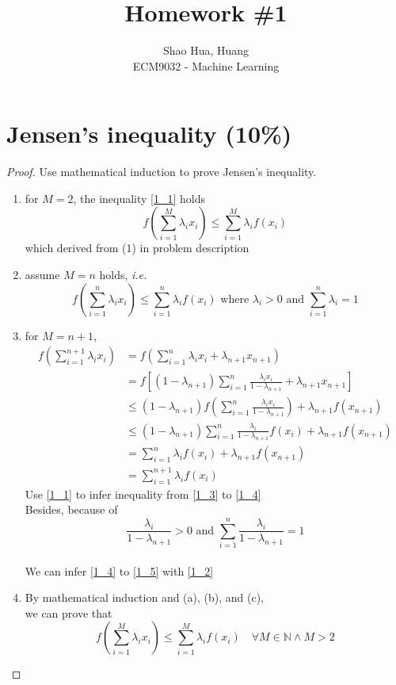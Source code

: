 \documentclass[12pt]{article}
\title{Homework \#1}
\author{Shao Hua, Huang\\
ECM9032 - Machine Learning}
\numberwithin{equation}{section}
\begin{document}
\maketitle
\section{Jensen's inequality (10\%)}
\begin{proof}
Use mathematical induction to prove Jensen's inequality.
  \begin{enumerate}[label=(\alph*)]
    \item for $M = 2$, the inequality \eqref{1_1} holds
      \begin{equation}\label{1_1} 
        f(\sum_{i=1}^{M}\lambda_ix_i)\leq\sum_{i=1}^{M}\lambda_if(x_i)
      \end{equation}
      which derived from (1) in problem description
    \item assume $M = n$ holds, \textit{i.e.}
      \begin{equation}\label{1_2}
        f(\sum_{i=1}^{n}\lambda_ix_i)\leq\sum_{i=1}^{n}\lambda_if(x_i) \text{ where }
        \lambda_i>0 \text{ and } \sum_{i=1}^n\lambda_i=1
      \end{equation}
    \item for $M = n + 1$,
      \begin{align}
        f(\sum_{i=1}^{n+1}\lambda_ix_i) & = f(\sum_{i=1}^{n}\lambda_ix_i+\lambda_{n+1}x_{n+1})\nonumber\\
         & = f\left[(1-\lambda_{n+1})\sum_{i=1}^{n}\frac{\lambda_ix_i}{1-\lambda_{n+1}}+\lambda_{n+1}x_{n+1}\right]\label{1_3}\\
         & \leq (1-\lambda_{n+1})f(\sum_{i=1}^n\frac{\lambda_ix_i}{1-\lambda_{n+1}})+\lambda_{n+1}f(x_{n+1})\label{1_4}\\
         & \leq (1-\lambda_{n+1})\sum_{i=1}^n\frac{\lambda_i}{1-\lambda_{n+1}}f(x_i)+\lambda_{n+1}f(x_{n+1})\label{1_5}\\
         & = \sum_{i=1}^{n}\lambda_if(x_i)+\lambda_{n+1}f(x_{n+1})\nonumber\\
         & = \sum_{i=1}^{n+1}\lambda_if(x_i)\nonumber
      \end{align}
      Use \eqref{1_1} to infer inequality from \eqref{1_3} to \eqref{1_4}\\
      Besides, because of $$\frac{\lambda_i}{1-\lambda_{n+1}}>0 \text{ and } \sum_{i=1}^n\frac{\lambda_i}{1-\lambda_{n+1}}=1$$\\
      We can infer \eqref{1_4} to \eqref{1_5} with \eqref{1_2}
    \item
      By mathematical induction and (a), (b), and (c),\\
      we can prove that $$f(\sum_{i=1}^{M}\lambda_ix_i)\leq\sum_{i=1}^{M}\lambda_if(x_i)\quad\forall M\in\mathbb{N}\wedge M>2$$
  \end{enumerate}
\end{proof}
\end{document}
